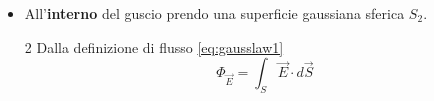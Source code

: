 \documentclass[twoside]{article}
\begin{document}
\begin{itemize}
\begin{multicols}{2}
              Dalla legge di Gauss \ref{eq:gausslaw2}
              \begin{equation*}
                  \Phi_{\vec{E}} = \displaystyle \frac{Q^{int}}{\varepsilon_0}
              \end{equation*}
          \end{multicols}
          \begin{equation*}
              \Phi_{\vec{E}} = \displaystyle \int_{S_1} \vec{E} \cdot d\vec{S}_1
          \end{equation*}
          \begin{equation*}
              \displaystyle \frac{Q}{\varepsilon_0} = \displaystyle \int_{S_1} \vec{E} \cdot d\vec{S}_1
          \end{equation*}
          \begin{equation*}
              \displaystyle \frac{Q}{\varepsilon_0} = \vec{E} \cdot \displaystyle \int_{S_1} d\vec{S}_1
          \end{equation*}
          \begin{equation*}
              \displaystyle \frac{Q}{\varepsilon_0} = \vec{E} \cdot \vec{S}_1
          \end{equation*}
          \begin{equation*}
              \vec{E} = \displaystyle \frac{Q}{\varepsilon_0} \cdot \frac{1}{S_1}
          \end{equation*}
          \begin{equation}
              \boxed{\vec{E} = \displaystyle \frac{Q}{4\pi \varepsilon_0 r_{1}^2}}
          \end{equation}
    \item All'\textbf{interno} del guscio prendo una superficie gaussiana sferica $S_2$.\\
          \begin{multicols}{2}
              \noindent
              Dalla definizione di flusso \ref{eq:gausslaw1}
              \begin{equation*}
                  \Phi_{\vec{E}} = \displaystyle \int_{S} \vec{E} \cdot d\vec{S}
              \end{equation*}
              \columnbreak
              \noindent


\end{multicols}
\end{itemize}
\end{document}
